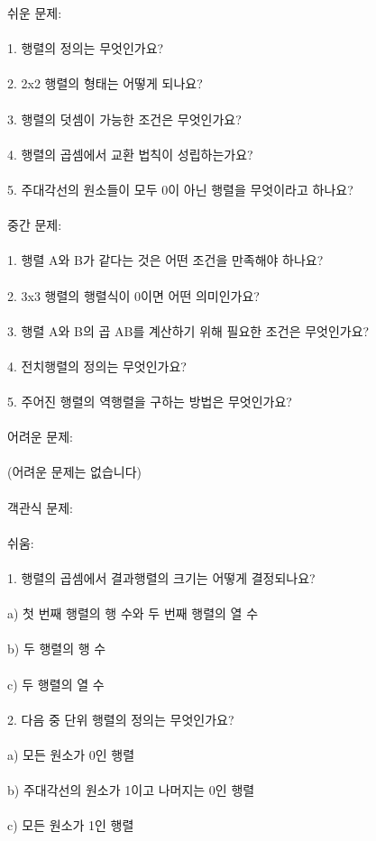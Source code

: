\documentclass[fleqn]{article}
\begin{document}
      
      쉬운 문제: \\\\  
1. 행렬의 정의는 무엇인가요? \\\\
2. 2x2 행렬의 형태는 어떻게 되나요? \\\\
3. 행렬의 덧셈이 가능한 조건은 무엇인가요? \\\\
4. 행렬의 곱셈에서 교환 법칙이 성립하는가요? \\\\
5. 주대각선의 원소들이 모두 0이 아닌 행렬을 무엇이라고 하나요? \\\\

중간 문제: \\\\  
1. 행렬 A와 B가 같다는 것은 어떤 조건을 만족해야 하나요? \\\\
2. 3x3 행렬의 행렬식이 0이면 어떤 의미인가요? \\\\
3. 행렬 A와 B의 곱 AB를 계산하기 위해 필요한 조건은 무엇인가요? \\\\
4. 전치행렬의 정의는 무엇인가요? \\\\
5. 주어진 행렬의 역행렬을 구하는 방법은 무엇인가요? \\\\

어려운 문제: \\\\  
(어려운 문제는 없습니다) \\\\

객관식 문제: \\\\  
쉬움: \\\\  
1. 행렬의 곱셈에서 결과행렬의 크기는 어떻게 결정되나요? \\\\
   a) 첫 번째 행렬의 행 수와 두 번째 행렬의 열 수 \\\\
   b) 두 행렬의 행 수 \\\\
   c) 두 행렬의 열 수 \\\\
  
2. 다음 중 단위 행렬의 정의는 무엇인가요? \\\\
   a) 모든 원소가 0인 행렬 \\\\
   b) 주대각선의 원소가 1이고 나머지는 0인 행렬 \\\\
   c) 모든 원소가 1인 행렬 \\\\
  
\end{document}
